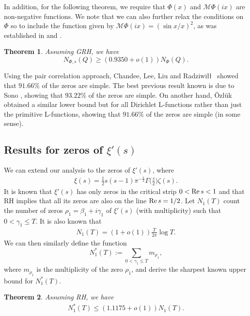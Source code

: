 \documentclass[reqno]{amsart}
\newtheorem{theorem}{Theorem}
\newcommand{\M}{\mathcal{M}}
\newcommand{\re}{{\rm Re}\,}
\begin{document}
In addition, for the following theorem, we require that $\Phi(x)$ and $\M \Phi(ix)$ are non-negative functions. We note that we can also further relax the conditions on $\Phi$ so to include the function given by $\M\Phi(ix) = (\sin x/x)^2$, as was established in \cite{CLLR} and \cite{S}. 

\begin{theorem} \label{thmsimplezerosofdir} 
Assuming GRH, we have
\[
N_{\Phi,s}(Q)\geq (0.9350+o(1))N_{\Phi}(Q). 
\]
\end{theorem}

Using the pair correlation approach, Chandee, Lee, Liu and Radziwi\l\l \ \cite{CLLR} showed that $91.66\%$ of the zeros are simple. The best previous result known is due to Sono \cite{S}, showing that $93.22\%$ of the zeros are simple. On another hand, \"{O}zl\"{u}k \cite{O} obtained a similar lower bound but for all Dirichlet L-functions rather than just the primitive L-functions, showing that $91.66\%$ of the zeros are simple (in some sense).





\subsection{Results for zeros of $\xi'(s)$}
We can extend our analysis to the zeros of $\xi'(s)$, where
\begin{align*}
\xi(s)=\frac{1}{2}s(s-1)\pi^{-\frac{s}{2}}\Gamma\bigg(\frac{s}{2}\bigg)\zeta(s).
\end{align*}
It is known that $\xi'(s)$ has only zeros in the critical strip $0<\re s<1$ and that RH implies that all its zeros are also on the line $\re s=1/2$. Let $N_1(T)$ count the number of zeros $\rho_1=\beta_1+i\gamma_1$ of $\xi'(s)$ (with multiplicity) such that $0< \gamma_1 \leq T$. It is also known that
\begin{align*}
N_1(T) =  (1+o(1)) \frac{T}{2\pi} \log T.
\end{align*}
We can then similarly define the function 
$$
N_{1}^{*}(T):=\displaystyle\sum_{0<\gamma_1\leq T}m_{\rho_1},
$$
where $m_{\rho_1}$ is the multiplicity of the zero $\rho_1$, and derive the sharpest known upper bound for $N_1^*(T)$.
\begin{theorem}\label{thmn1star}
	Assuming RH, we have
	\begin{align*}
	N_1^*(T)\leq (1.1175+o(1))N_1(T).
	\end{align*}
\end{theorem}
\end{document}
